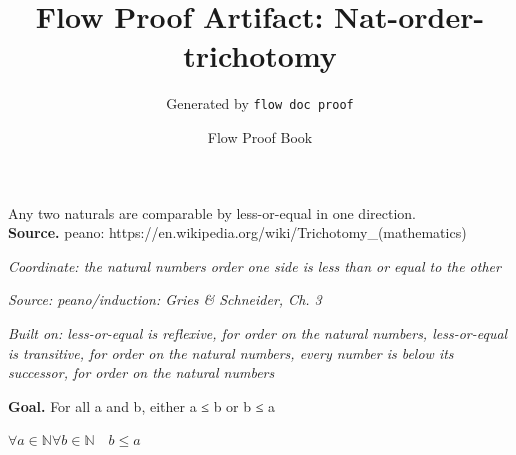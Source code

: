\documentclass[11pt]{article}
\title{Flow Proof Artifact: Nat-order-trichotomy}
\author{Generated by \texttt{flow doc proof}}
\date{Flow Proof Book}
\theoremstyle{definition}
\begin{document}
\maketitle
Any two naturals are comparable by less-or-equal in one direction.\\[0.5em]
\textbf{Source.} peano: https://en.wikipedia.org/wiki/Trichotomy\_(mathematics)\\[0.5em]
\bigskip
{}\par
\smallskip\noindent\textit{Coordinate: the natural numbers \cdot order \cdot one side is less than or equal to the other}\par
\smallskip\noindent\textit{Source: peano/induction: Gries \& Schneider, Ch. 3}\par
\smallskip\noindent\textit{Built on: less-or-equal is reflexive, for order on the natural numbers, less-or-equal is transitive, for order on the natural numbers, every number is below its successor, for order on the natural numbers}\par
\medskip
\noindent\textbf{Goal.} For all a and b, either a ≤ b or b ≤ a\par
\noindent$\displaystyle \forall a \in \mathbb{N} \forall b \in \mathbb{N}\quad b \le a$\par
\medskip
\noindent
\end{document}
